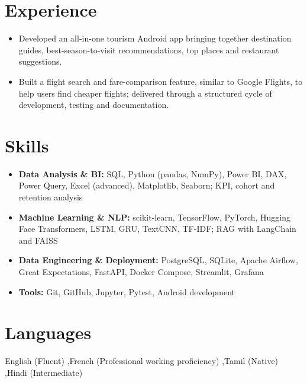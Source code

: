 \section{Experience}
\begin{itemize}
  \item Developed an all-in-one tourism Android app bringing together destination guides, best-season-to-visit recommendations, top places and restaurant suggestions.
  \item Built a flight search and fare-comparison feature, similar to Google Flights, to help users find cheaper flights; delivered through a structured cycle of development, testing and documentation.
\end{itemize}

\section{Skills}
\begin{itemize}
  \item \textbf{Data Analysis \& BI:} SQL, Python (pandas, NumPy), Power BI, DAX, Power Query, Excel (advanced), Matplotlib, Seaborn; KPI, cohort and retention analysis
  \item \textbf{Machine Learning \& NLP:} scikit-learn, TensorFlow, PyTorch, Hugging Face Transformers, LSTM, GRU, TextCNN, TF-IDF; RAG with LangChain and FAISS
  \item \textbf{Data Engineering \& Deployment:} PostgreSQL, SQLite, Apache Airflow, Great Expectations, FastAPI, Docker Compose, Streamlit, Grafana
  \item \textbf{Tools:} Git, GitHub, Jupyter, Pytest, Android development
\end{itemize}

\section{Languages}
English (Fluent) \sep French (Professional working proficiency) \sep Tamil (Native) \sep Hindi (Intermediate)



